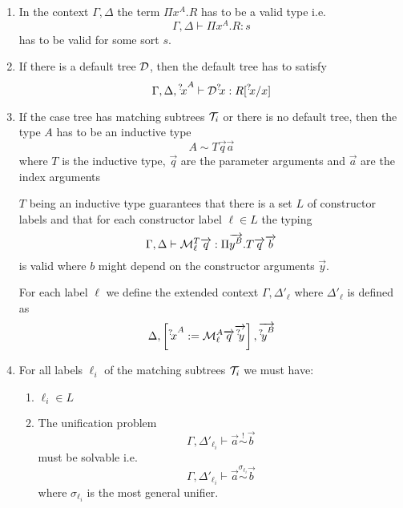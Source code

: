 \begin{enumerate}

    \item In the context $\Gamma,\Delta$ the term $\Pi x^A. R$ has to be a valid
        type i.e.
        $$
        \Gamma,\Delta
        \vdash
        \Pi x^A. R: s
        $$
        has to be valid for some sort $s$.

    \item If there is a default tree ${\mathcal D}$, then the default tree has to
        satisfy
        $$
        \Gamma, \Delta, {{}^? \kern-0.2em x}^A
        \vdash
        {\mathcal D} {{}^? \kern-0.2em x} : R[{{}^? \kern-0.2em x} / x]
        $$


    \item If the case tree has matching subtrees ${\mathcal T}_i$ or there is no
        default tree, then the type $A$ has to be an inductive type
        $$
            A \sim T \vec q \vec a
        $$
        where $T$ is the inductive type, $\vec q$ are the parameter arguments
        and $\vec a$ are the index arguments

        $T$ being an inductive type guarantees that there is a set $L$ of
        constructor labels and that for each constructor label
        $\ell \in L$ the typing
        $$
            \Gamma, \Delta
            \vdash
            {\cal M}_\ell^T {\overrightarrow {q}}
            :
            \Pi {\overrightarrow {y^B}}. T {\overrightarrow {q}} {\overrightarrow {b}}
        $$
        is valid where $b$ might depend on the constructor arguments $\vec y$.

        For each label $\ell$ we define the extended context $\Gamma,
        \Delta'_\ell$ where $\Delta'_\ell$ is defined as
        $$
            \Delta,
            \left[ {
                {{}^? \kern-0.2em x}^A := {\cal M}^A_{\ell} {\overrightarrow {q}} {\overrightarrow {{{}^? \kern-0.2em y}}}
            } \right],
            {\overrightarrow {{{}^? \kern-0.2em y}^B}}
        $$

    \item
        For all labels $\ell_i$ of the matching subtrees ${\mathcal T}_i$ we must have:
        \begin{enumerate}

            \item $\ell_i \in L$


            \item The unification problem
                $$
                    \Gamma, \Delta'_{\ell_i}
                    \vdash
                    \vec a \stackrel ! \sim \vec b
                $$
                must be solvable i.e.
                $$
                    \Gamma, \Delta'_{\ell_i}
                    \vdash
                    \vec a \stackrel {\sigma_{\ell_i}} \sim \vec b
                $$
                where $\sigma_{\ell_i}$ is the most general unifier.


\end{enumerate}
\end{enumerate}
